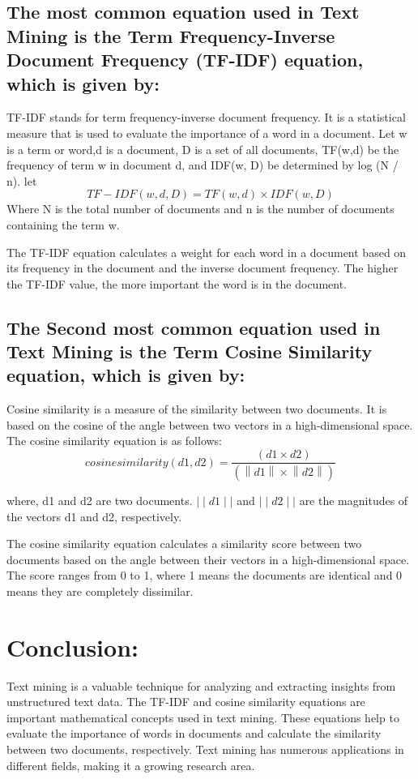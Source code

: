 \documentclass{article}
\begin{document}
\subsection{The most common equation used in Text Mining is the Term Frequency-Inverse Document Frequency (TF-IDF) equation, which is given by:}
TF-IDF stands for term frequency-inverse document frequency. It is a statistical measure that is used to evaluate the importance of a word in a document.
Let w is a term or word,d is a document, D is a set of all documents, TF(w,d) be the frequency of term w in document d, and IDF(w, D) be determined by log (N / n).
let
\[TF-IDF(w,d,D) = TF(w,d)\times{IDF(w,D)}\]
Where N is the total number of documents and n is the number of documents containing the term w.

The TF-IDF equation calculates a weight for each word in a document based on its frequency in the document and the inverse document frequency. The higher the TF-IDF value, the more important the word is in the document.

\subsection{The Second most common equation used in Text Mining is the Term Cosine Similarity equation, which is given by:}
Cosine similarity is a measure of the similarity between two documents. It is based on the cosine of the angle between two vectors in a high-dimensional space. The cosine similarity equation is as follows:
\[cosine similarity(d1,d2) =\dfrac{(d1\times{d2})}{(\left \| d1 \right \|\times{\left \| d2 \right \|})}\]

where,
d1 and d2 are two documents.
$\mid  \mid d1 \mid\mid$ and $\mid\mid d2 \mid\mid$ are the magnitudes of the vectors d1 and d2, respectively.

The cosine similarity equation calculates a similarity score between two documents based on the angle between their vectors in a high-dimensional space. The score ranges from 0 to 1, where 1 means the documents are identical and 0 means they are completely dissimilar.


\section{Conclusion:}
Text mining is a valuable technique for analyzing and extracting insights from unstructured text data. The TF-IDF and cosine similarity equations are important mathematical concepts used in text mining. These equations help to evaluate the importance of words in documents and calculate the similarity between two documents, respectively. Text mining has numerous applications in different fields, making it a growing research area.


 
\end{document}
